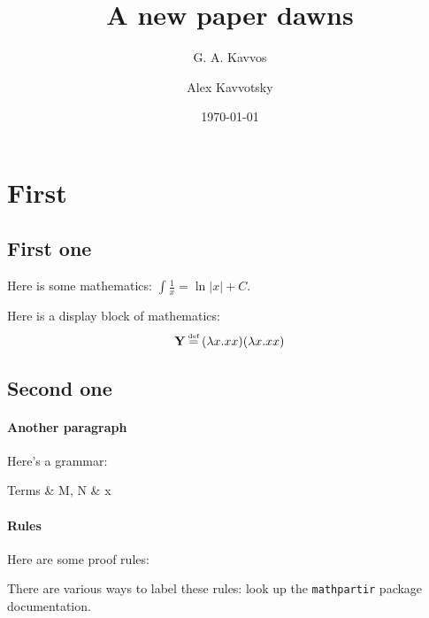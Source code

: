 \documentclass{scrartcl}
\title{A new paper dawns}
\author{G. A. Kavvos \and Alex Kavvotsky}
\date{\today}
\begin{document}
\maketitle

\begin{abstract}
  \lipsum[1]
\end{abstract}

\tableofcontents


\section{First}
  \label{section:first}

\subsection{First one}
  Here is some mathematics: \( \int \frac{1}{x} = \ln |x| + C \).
  
  Here is a display block of mathematics:
  \[
    \mathbf{Y} \defeq (\lambda x. xx)(\lambda x. xx)
  \]

  \lipsum[1] \parencite{qian2021}

\subsection{Second one}
  \lipsum[2]
  
  \paragraph{Another paragraph}
  Here's a grammar:
  \begin{grammar}
    Terms & M, N & x \mid {} \mid {}
  \end{grammar}

  \lipsum[3]
  
  \paragraph{Rules}

  Here are some proof rules:
  There are various ways to label these rules: look up the \texttt{mathpartir} package documentation.
\end{document}
